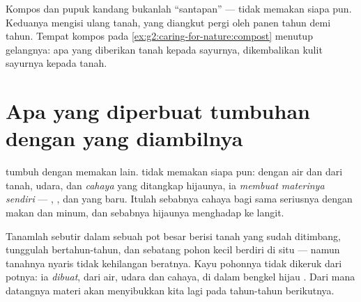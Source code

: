 \begin{remark}\label{rem:g4:what-plants-need:soil}
Kompos dan pupuk kandang bukanlah ``santapan''  --- 
tidak memakan siapa pun. Keduanya mengisi ulang  tanah,
yang diangkut pergi oleh panen tahun demi tahun. Tempat kompos pada
\cref{ex:g2:caring-for-nature:compost} menutup gelangnya: apa yang
diberikan tanah kepada sayurnya, dikembalikan kulit sayurnya kepada
tanah.
\end{remark}

\section{Apa yang diperbuat tumbuhan dengan yang diambilnya}

\begin{proposition}\label{prop:g4:what-plants-need:make}
 tumbuh dengan memakan  lain.  tidak memakan
siapa pun: dengan air dan  dari tanah, udara, dan 
\emph{cahaya} yang ditangkap  hijaunya, ia \emph{membuat materinya
sendiri} --- , ,  dan  yang baru. Itulah sebabnya
cahaya bagi  sama seriusnya dengan makan dan minum, dan
sebabnya  hijaunya menghadap ke langit.
\end{proposition}
\admitted

\begin{example}\label{ex:g4:what-plants-need:tree}
Tanamlah sebutir  dalam sebuah pot besar berisi tanah yang sudah
ditimbang, tunggulah bertahun-tahun, dan sebatang pohon kecil berdiri
di situ --- namun tanahnya nyaris tidak kehilangan beratnya. Kayu
pohonnya tidak dikeruk dari potnya: ia \emph{dibuat}, dari air, udara
dan cahaya, di dalam bengkel hijau . Dari mana datangnya materi
 akan menyibukkan kita lagi pada tahun-tahun berikutnya.
\end{example}

